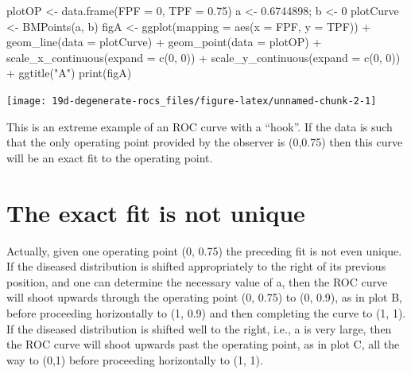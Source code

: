 \documentclass[
]{book}
\newenvironment{Shaded}{\begin{snugshade}}{\end{snugshade}}
\newcommand{\AttributeTok}[1]{\textcolor[rgb]{0.77,0.63,0.00}{#1}}
\newcommand{\DecValTok}[1]{\textcolor[rgb]{0.00,0.00,0.81}{#1}}
\newcommand{\FloatTok}[1]{\textcolor[rgb]{0.00,0.00,0.81}{#1}}
\newcommand{\FunctionTok}[1]{\textcolor[rgb]{0.00,0.00,0.00}{#1}}
\newcommand{\NormalTok}[1]{#1}
\newcommand{\OtherTok}[1]{\textcolor[rgb]{0.56,0.35,0.01}{#1}}
\newcommand{\SpecialCharTok}[1]{\textcolor[rgb]{0.00,0.00,0.00}{#1}}
\newcommand{\StringTok}[1]{\textcolor[rgb]{0.31,0.60,0.02}{#1}}
\begin{document}
\begin{Shaded}
\begin{Highlighting}[]
\NormalTok{plotOP }\OtherTok{\textless{}{-}} \FunctionTok{data.frame}\NormalTok{(}\AttributeTok{FPF =} \DecValTok{0}\NormalTok{, }\AttributeTok{TPF =} \FloatTok{0.75}\NormalTok{)}
\NormalTok{a }\OtherTok{\textless{}{-}} \FloatTok{0.6744898}\NormalTok{; b }\OtherTok{\textless{}{-}} \DecValTok{0}
\NormalTok{plotCurve }\OtherTok{\textless{}{-}} \FunctionTok{BMPoints}\NormalTok{(a, b)}
\NormalTok{figA }\OtherTok{\textless{}{-}} \FunctionTok{ggplot}\NormalTok{(}\AttributeTok{mapping =} \FunctionTok{aes}\NormalTok{(}\AttributeTok{x =}\NormalTok{ FPF, }\AttributeTok{y =}\NormalTok{ TPF)) }\SpecialCharTok{+} 
  \FunctionTok{geom\_line}\NormalTok{(}\AttributeTok{data =}\NormalTok{ plotCurve) }\SpecialCharTok{+} 
  \FunctionTok{geom\_point}\NormalTok{(}\AttributeTok{data =}\NormalTok{ plotOP)  }\SpecialCharTok{+} 
  \FunctionTok{scale\_x\_continuous}\NormalTok{(}\AttributeTok{expand =} \FunctionTok{c}\NormalTok{(}\DecValTok{0}\NormalTok{, }\DecValTok{0}\NormalTok{)) }\SpecialCharTok{+} 
  \FunctionTok{scale\_y\_continuous}\NormalTok{(}\AttributeTok{expand =} \FunctionTok{c}\NormalTok{(}\DecValTok{0}\NormalTok{, }\DecValTok{0}\NormalTok{)) }\SpecialCharTok{+}
  \FunctionTok{ggtitle}\NormalTok{(}\StringTok{"A"}\NormalTok{)}
\FunctionTok{print}\NormalTok{(figA)}
\end{Highlighting}
\end{Shaded}

\begin{center}\texttt{[image: 19d-degenerate-rocs\_files/figure-latex/unnamed-chunk-2-1]} \end{center}

This is an extreme example of an ROC curve with a ``hook''. If the data is such that the only operating point provided by the observer is (0,0.75) then this curve will be an exact fit to the operating point.

\hypertarget{the-exact-fit-is-not-unique}{%
\section{The exact fit is not unique}\label{the-exact-fit-is-not-unique}}

Actually, given one operating point (0, 0.75) the preceding fit is not even unique. If the diseased distribution is shifted appropriately to the right of its previous position, and one can determine the necessary value of a, then the ROC curve will shoot upwards through the operating point (0, 0.75) to (0, 0.9), as in plot B, before proceeding horizontally to (1, 0.9) and then completing the curve to (1, 1). If the diseased distribution is shifted well to the right, i.e., a is very large, then the ROC curve will shoot upwards past the operating point, as in plot C, all the way to (0,1) before proceeding horizontally to (1, 1).
\end{document}
